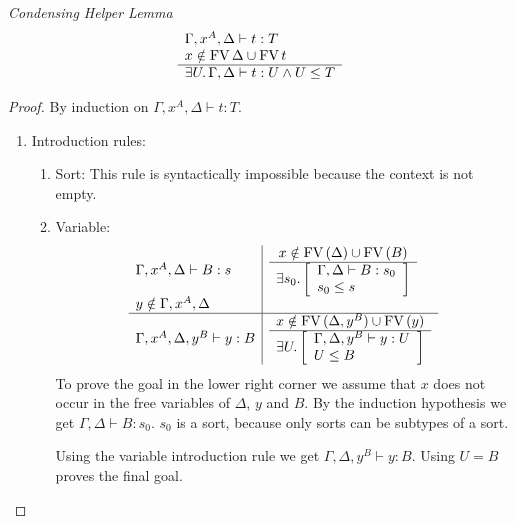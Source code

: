 \begin{lemma}
    \label{CondensingHelper}
    \emph{Condensing Helper Lemma}
    $$
    \begin{array}{l} 
        \Gamma,x^A,\Delta \vdash t: T
        \\
        x \notin \text{FV}\, \Delta \cup  \text{FV}\, t
     \\ \hline 
        \exists U. \, \Gamma, \Delta \vdash t : U \land U \le T
    \end{array}
    $$

    \begin{proof}
        {\newcommand{\goal}[4]{
            \ruleh {
                x \notin \FV (#1) \cup \FV (#2)
            }
            {
                \exists #3.
                \left[
                \begin{array}{l}
                    \Gamma,#1 \vdash #2 : #3
                    \\
                    #3 \le #4
                \end{array}
                \right]
            }
         }
        By induction on $\Gamma,x^A,\Delta \vdash t: T$.

        \begin{enumerate}
            \item Introduction rules:
            \begin{enumerate}
                \item Sort: This rule is syntactically impossible because the
                    context is not empty.

                \item Variable:
                $$
                \begin{array}{l|l}
                    \Gamma,x^A,\Delta \vdash B : s
                    &
                    \goal \Delta B {s_0} s
                    \\
                    y \notin \Gamma,x^A,\Delta
                    \\
                    \hline
                    \Gamma,x^A,\Delta,y^B \vdash y :B
                    &
                    \goal {\Delta,y^B} y U B
                \end{array}
                $$
                To prove the goal in the lower right corner we assume that $x$
                    does not occur in the free variables of $\Delta$, $y$ and
                    $B$. By the induction hypothesis we get $\Gamma,\Delta
                    \vdash B: s_0$. $s_0$ is a sort, because only sorts can be
                    subtypes of a sort.

                    Using the variable introduction rule we get
                    $\Gamma,\Delta,y^B \vdash y : B$. Using $U = B$ proves the
                    final goal.


\end{enumerate}
\end{enumerate}}
\end{proof}
\end{lemma}
